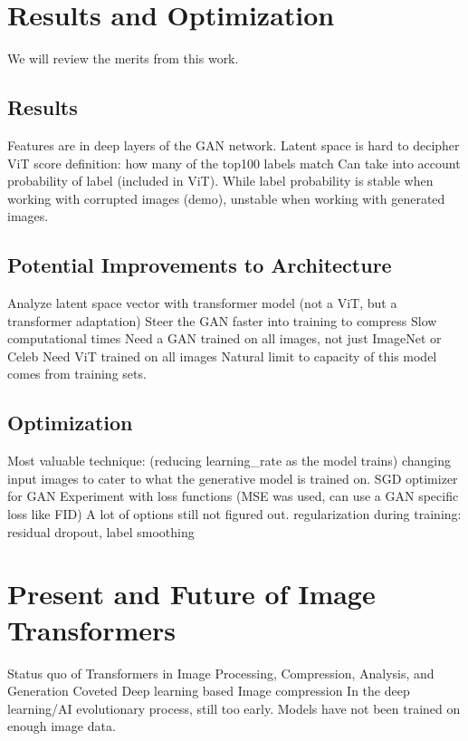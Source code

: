 \section{Results and Optimization}
We will review the merits from this work.

\subsection{Results}

Features are in deep layers of the GAN network. 
Latent space is hard to decipher
ViT score definition: how many of the top100 labels match
Can take into account probability of label (included in ViT).
While label probability is stable when working with corrupted images (demo), 
unstable when working with generated images.

\subsection{Potential Improvements to Architecture}

Analyze latent space vector with transformer model (not a ViT, but a transformer adaptation)
Steer the GAN faster into training to compress
Slow computational times
Need a GAN trained on all images, not just ImageNet or Celeb 
Need ViT trained on all images
Natural limit to capacity of this model comes from training sets.

\subsection{Optimization}

Most valuable technique:
(reducing learning\_rate as the model trains)
changing input images to cater to what the generative model is trained on.
SGD optimizer for GAN
Experiment with loss functions (MSE was used, can use a GAN specific loss like FID)
A lot of options still not figured out.
regularization during training: residual dropout, label smoothing

\newpage
\section{Present and Future of Image Transformers}
Status quo of Transformers in Image Processing, Compression, Analysis, and Generation
Coveted Deep learning based Image compression 
In the deep learning/AI evolutionary process, still too early. Models have not been trained on enough image data.

